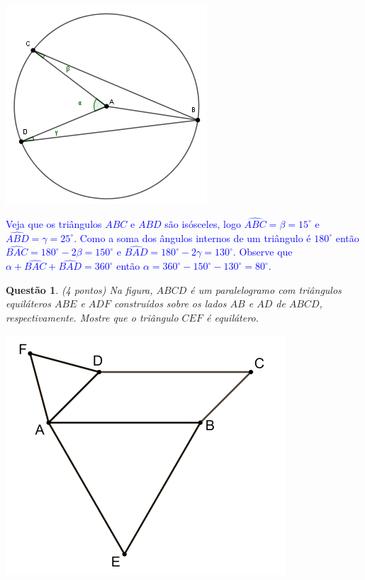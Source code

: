 \documentclass[oneside,a4paper,12pt]{article}
\theoremstyle{Colorido}
\theoremstyle{solu}
\theoremstyle{dotlessP}
\newtheorem{sol}{Questão}
\begin{document}
\begin{center}
\includegraphics[scale=2.5]{Provas e Avaliações/Figuras avaliações/6avaliacaociclo3.png}
\end{center}
\textcolor{blue}{Veja que os triângulos $ABC$ e $ABD$ são isósceles, logo $\widehat{ABC}=\beta=15^\circ$ e $\widehat{ABD}= \gamma=25^\circ$. Como a soma dos ângulos internos de um triângulo é $180^\circ$ então $\widehat{BAC}=180^\circ - 2 \beta =150^\circ$ e $\widehat{BAD}= 180^\circ - 2 \gamma = 130^\circ$. Observe que $\alpha + \widehat{BAC} + \widehat{BAD}=360^\circ$ então $\alpha=360^\circ -150^\circ - 130^\circ=80^\circ$.}
\newpage
	\begin{sol}
\textit{(4 pontos)} \newline \newline
Na figura, $ABCD$ é um paralelogramo com triângulos equiláteros $ABE$ e $ADF$ construídos sobre os lados $AB$ e $AD$ de $ABCD$, respectivamente. Mostre que o triângulo $CEF$ é equilátero.
\begin{center}
\includegraphics[scale=0.6]{Provas e Avaliações/Figuras avaliações/7avaliacaociclo3.png}
\end{center}
\end{sol}
\end{document}
